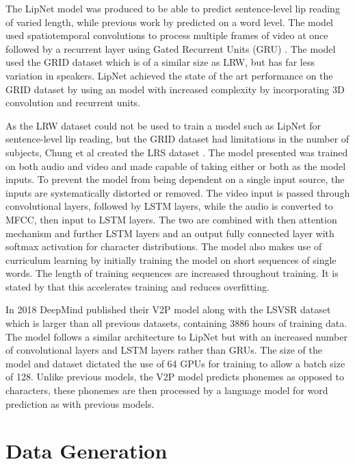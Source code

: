 \documentclass[12pt]{article}
\begin{document}
The LipNet model \cite{Assael2016} was produced to be able to predict sentence-level lip reading of varied length, while previous work by \cite{Chung2016} predicted on a word level.
The model used spatiotemporal convolutions to process multiple frames of video at once followed by a recurrent layer using Gated Recurrent Units (GRU) \cite{Cho2014}.
The model used the GRID dataset \cite{Cooke2006} which is of a similar size as LRW, but has far less variation in speakers.
LipNet achieved the state of the art performance on the GRID dataset by using an model with increased complexity by incorporating 3D convolution and recurrent units.

As the LRW dataset could not be used to train a model such as LipNet for sentence-level lip reading, but the GRID dataset had limitations in the number of subjects, Chung et al created the LRS dataset \cite{Chung2017}.
The model presented was trained on both audio and video and made capable of taking either or both as the model inputs.
To prevent the model from being dependent on a single input source, the inputs are systematically distorted or removed.
The video input is passed through convolutional layers, followed by LSTM layers, while the audio is converted to MFCC, then input to LSTM layers.
The two are combined with then attention mechanism and further LSTM layers and an output fully connected layer with softmax activation for character distributions.
The model also makes use of curriculum learning by initially training the model on short sequences of single words.
The length of training sequences are increased throughout training.
It is stated by \cite{Chung2017} that this accelerates training and reduces overfitting.

In 2018 DeepMind published their V2P model \cite{Shillingford2018} along with the LSVSR dataset which is larger than all previous datasets, containing 3886 hours of training data.
The model follows a similar architecture to LipNet \cite{Assael2016} but with an increased number of convolutional layers and LSTM layers rather than GRUs.
The size of the model and dataset dictated the use of 64 GPUs for training to allow a batch size of 128.
Unlike previous models, the V2P model predicts phonemes as opposed to characters, these phonemes are then processed by a language model for word prediction as with previous models.


\section{Data Generation}
\end{document}
